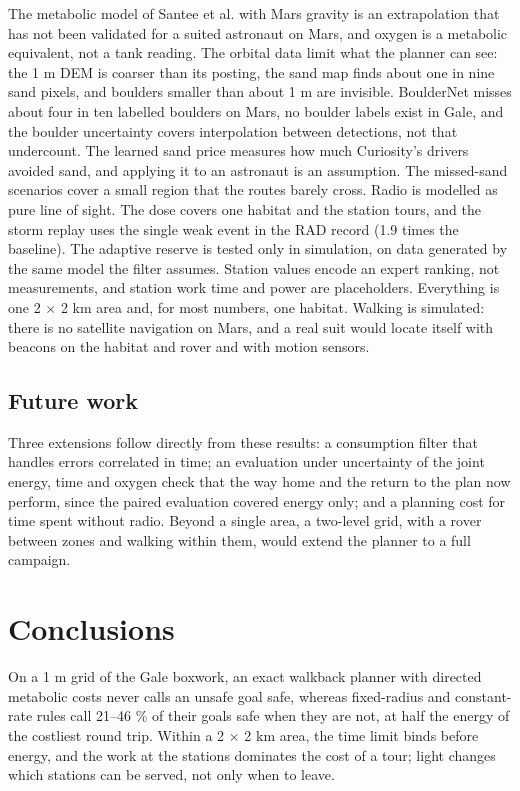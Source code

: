 \documentclass[11pt,a4paper]{article}
\begin{document}
The metabolic model of Santee et al. with Mars gravity is an extrapolation that has not been validated for a suited astronaut on Mars, and oxygen is a metabolic equivalent, not a tank reading. The orbital data limit what the planner can see: the 1 m DEM is coarser than its posting, the sand map finds about one in nine sand pixels, and boulders smaller than about 1 m are invisible. BoulderNet misses about four in ten labelled boulders on Mars, no boulder labels exist in Gale, and the boulder uncertainty covers interpolation between detections, not that undercount. The learned sand price measures how much Curiosity's drivers avoided sand, and applying it to an astronaut is an assumption. The missed-sand scenarios cover a small region that the routes barely cross. Radio is modelled as pure line of sight. The dose covers one habitat and the station tours, and the storm replay uses the single weak event in the RAD record (1.9 times the baseline). The adaptive reserve is tested only in simulation, on data generated by the same model the filter assumes. Station values encode an expert ranking, not measurements, and station work time and power are placeholders. Everything is one 2 $\times$ 2 km area and, for most numbers, one habitat. Walking is simulated: there is no satellite navigation on Mars, and a real suit would locate itself with beacons on the habitat and rover and with motion sensors.

\subsection{Future work}

Three extensions follow directly from these results: a consumption filter that handles errors correlated in time; an evaluation under uncertainty of the joint energy, time and oxygen check that the way home and the return to the plan now perform, since the paired evaluation covered energy only; and a planning cost for time spent without radio. Beyond a single area, a two-level grid, with a rover between zones and walking within them, would extend the planner to a full campaign.

\section{Conclusions}

On a 1 m grid of the Gale boxwork, an exact walkback planner with directed metabolic costs never calls an unsafe goal safe, whereas fixed-radius and constant-rate rules call 21--46 \% of their goals safe when they are not, at half the energy of the costliest round trip. Within a 2 $\times$ 2 km area, the time limit binds before energy, and the work at the stations dominates the cost of a tour; light changes which stations can be served, not only when to leave.
\end{document}
